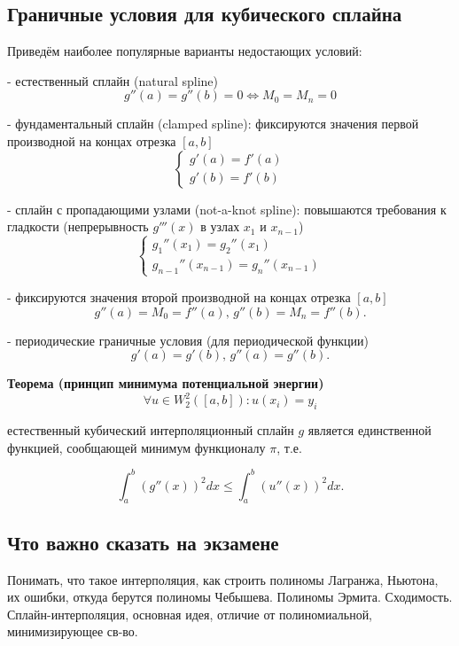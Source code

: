 \subsection{Граничные условия для кубического сплайна}

Приведём наиболее популярные варианты недостающих условий:

- естественный сплайн (natural spline)  
$$  g''(a) = g''(b) = 0 \Leftrightarrow M_0 = M_n = 0$$

- фундаментальный сплайн (clamped spline): фиксируются значения первой производной на концах отрезка \([a, b]\)  
$$  \begin{cases} 
	g'(a) = f'(a) \\ 
	g'(b) = f'(b) 
\end{cases}$$

- сплайн с пропадающими узлами (not-a-knot spline): повышаются требования к гладкости (непрерывность \(g'''(x)\) в узлах \(x_1\) и \(x_{n-1}\))  
$$  \begin{cases} 
	g_1''(x_1) = g_2''(x_1) \\ 
	g_{n-1}''(x_{n-1}) = g_n''(x_{n-1}) 
\end{cases}$$

- фиксируются значения второй производной на концах отрезка \([a, b]\)  
$$  g''(a) = M_0 = f''(a), \, g''(b) = M_n = f''(b).$$

- периодические граничные условия (для периодической функции)  
$$  g'(a) = g'(b), \, g''(a) = g''(b).$$

\textbf{Теорема (принцип минимума потенциальной энергии)}
\[\forall u \in W_2^2([a, b]) : u(x_i) = y_i\]

естественный кубический интерполяционный сплайн \( g \) является единственной функцией, сообщающей минимум функционалу \( \pi \), т.е.

$$\int_a^b (g''(x))^2 dx \leq \int_a^b (u''(x))^2 dx.$$

\subsection{Что важно сказать на экзамене}

Понимать, что такое интерполяция, как строить полиномы Лагранжа, Ньютона, их ошибки, откуда берутся полиномы Чебышева. Полиномы Эрмита. Сходимость. Сплайн-интерполяция, основная идея, отличие от полиномиальной, минимизирующее св-во. 

\newpage